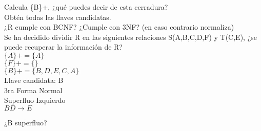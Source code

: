 \documentclass{article}
\begin{document}
\begin{enumerate}
    Calcula \{B\}+, ¿qué puedes decir de esta cerradura?\\
    Obtén todas las llaves candidatas.\\
    ¿R cumple con BCNF? ¿Cumple con 3NF? (en caso contrario normaliza)\\
    Se ha decidido dividir R en las siguientes relaciones S(A,B,C,D,F) y T(C,E), ¿se puede recuperar la
    información de R?\\
    $\{A\}+=\{A\}$\\
    $\{F\}+=\{\}$\\
    $\{B\}+=\{B,D,E,C,A\}$\\
    Llave candidata: B\\
    3ra Forma Normal\\
    Superfluo Izquierdo\\
    $BD \rightarrow E$

    ¿B superfluo?


\end{enumerate}
\end{document}
